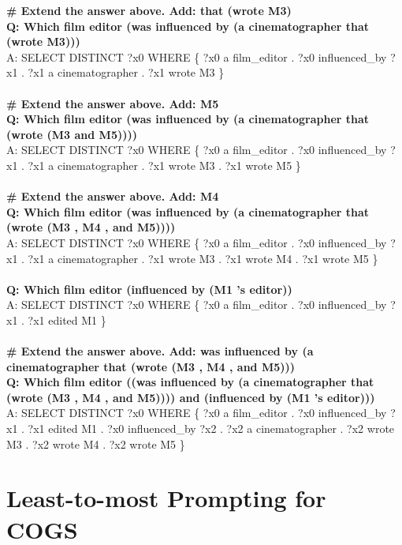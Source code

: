\documentclass{article} \usepackage{iclr2022_conference,times}
\newcommand{\prompt}[1]{{\footnotesize \textsf{#1}}}
\begin{document}
\prompt{\textbf{\# Extend the answer above. Add: that (wrote M3)} \\
\textbf{Q: Which film editor (was influenced by (a cinematographer that (wrote M3)))} \\
A: SELECT DISTINCT ?x0 WHERE \{ ?x0 a film\_editor . ?x0 influenced\_by ?x1 . ?x1 a cinematographer . ?x1 wrote M3 \} \\
\\
\textbf{\# Extend the answer above. Add: M5} \\
\textbf{Q: Which film editor (was influenced by (a cinematographer that (wrote (M3 and M5))))} \\
A: SELECT DISTINCT ?x0 WHERE \{ ?x0 a film\_editor . ?x0 influenced\_by ?x1 . ?x1 a cinematographer . ?x1 wrote M3 . ?x1 wrote M5 \} \\
\\
\textbf{\# Extend the answer above. Add: M4} \\
\textbf{Q: Which film editor (was influenced by (a cinematographer that (wrote (M3 , M4 , and M5))))} \\
A: SELECT DISTINCT ?x0 WHERE \{ ?x0 a film\_editor . ?x0 influenced\_by ?x1 . ?x1 a cinematographer . ?x1 wrote M3 . ?x1 wrote M4 . ?x1 wrote M5 \} \\
\\
\textbf{Q: Which film editor (influenced by (M1 's editor))} \\
A: SELECT DISTINCT ?x0 WHERE \{ ?x0 a film\_editor . ?x0 influenced\_by ?x1 . ?x1 edited M1 \} \\
\\
\textbf{\# Extend the answer above. Add: was influenced by (a cinematographer that (wrote (M3 , M4 , and M5)))} \\
\textbf{Q: Which film editor ((was influenced by (a cinematographer that (wrote (M3 , M4 , and M5)))) and (influenced by (M1 's editor)))}\\
A: SELECT DISTINCT ?x0 WHERE \{ ?x0 a film\_editor . ?x0 influenced\_by ?x1 . ?x1 edited M1 . ?x0 influenced\_by ?x2 . ?x2 a cinematographer . ?x2 wrote M3 . ?x2 wrote M4 . ?x2 wrote M5 \}
}


\section{Least-to-most Prompting for COGS}
\label{app:l2m_cogs}
\end{document}

